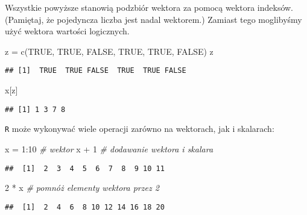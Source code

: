 \documentclass[
]{article}
\newenvironment{Shaded}{\begin{snugshade}}{\end{snugshade}}
\newcommand{\CommentTok}[1]{\textcolor[rgb]{0.56,0.35,0.01}{\textit{#1}}}
\newcommand{\ConstantTok}[1]{\textcolor[rgb]{0.00,0.00,0.00}{#1}}
\newcommand{\DecValTok}[1]{\textcolor[rgb]{0.00,0.00,0.81}{#1}}
\newcommand{\FunctionTok}[1]{\textcolor[rgb]{0.00,0.00,0.00}{#1}}
\newcommand{\NormalTok}[1]{#1}
\newcommand{\OtherTok}[1]{\textcolor[rgb]{0.56,0.35,0.01}{#1}}
\newcommand{\SpecialCharTok}[1]{\textcolor[rgb]{0.00,0.00,0.00}{#1}}
\begin{document}
Wszystkie powyższe stanowią podzbiór wektora za pomocą wektora indeksów.
(Pamiętaj, że pojedyncza liczba jest nadal wektorem.) Zamiast tego
moglibyśmy użyć wektora wartości logicznych.

\begin{Shaded}
\begin{Highlighting}[]
\NormalTok{z }\OtherTok{=} \FunctionTok{c}\NormalTok{(}\ConstantTok{TRUE}\NormalTok{, }\ConstantTok{TRUE}\NormalTok{, }\ConstantTok{FALSE}\NormalTok{, }\ConstantTok{TRUE}\NormalTok{, }\ConstantTok{TRUE}\NormalTok{, }\ConstantTok{FALSE}\NormalTok{)}
\NormalTok{z}
\end{Highlighting}
\end{Shaded}

\begin{verbatim}
## [1]  TRUE  TRUE FALSE  TRUE  TRUE FALSE
\end{verbatim}

\begin{Shaded}
\begin{Highlighting}[]
\NormalTok{x[z]}
\end{Highlighting}
\end{Shaded}

\begin{verbatim}
## [1] 1 3 7 8
\end{verbatim}

\texttt{R} może wykonywać wiele operacji zarówno na wektorach, jak i
skalarach:

\begin{Shaded}
\begin{Highlighting}[]
\NormalTok{x }\OtherTok{=} \DecValTok{1}\SpecialCharTok{:}\DecValTok{10}  \CommentTok{\# wektor}
\NormalTok{x }\SpecialCharTok{+} \DecValTok{1}     \CommentTok{\# dodawanie wektora i skalara}
\end{Highlighting}
\end{Shaded}

\begin{verbatim}
##  [1]  2  3  4  5  6  7  8  9 10 11
\end{verbatim}

\begin{Shaded}
\begin{Highlighting}[]
\DecValTok{2} \SpecialCharTok{*}\NormalTok{ x     }\CommentTok{\# pomnóż elementy wektora przez 2}
\end{Highlighting}
\end{Shaded}

\begin{verbatim}
##  [1]  2  4  6  8 10 12 14 16 18 20
\end{verbatim}
\end{document}
